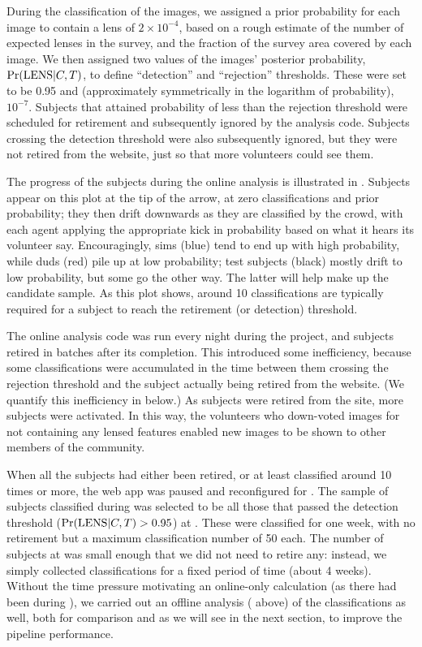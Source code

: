 \documentclass[useAMS,usenatbib,a4paper]{mn2e}
\begin{document}
During the \StageOne classification of the \cfhtls images, we assigned a prior
probability for each image to contain a lens of $2\times10^{-4}$, based on a
rough estimate of the number of expected lenses in the survey, and the fraction
of the survey area covered by each image. We then assigned two values of the
images' posterior probability, ${\rm Pr}({\rm LENS}|C,T)$, to define ``detection'' and
``rejection'' thresholds. These were set to be 0.95 and (approximately
symmetrically in the logarithm of probability), $10^{-7}$. Subjects that
attained probability of less than the rejection threshold were scheduled for
retirement and subsequently ignored by the analysis code. Subjects crossing the
detection threshold were also subsequently ignored, but they were not
retired from the website, just so that more volunteers could see them.

The progress of the subjects during the online analysis is illustrated in
. Subjects appear on this plot at the tip of
the arrow, at zero classifications and prior probability; they then drift
downwards as they are classified by the crowd, with each agent applying the
appropriate kick in probability based on what it hears its volunteer say.
Encouragingly, sims (blue) tend to end up with high probability, while duds
(red) pile up at low probability; test subjects (black) mostly drift to low
probability, but some go the other way. The latter will help make up the
candidate sample. As this plot shows, around 10 classifications are typically
required for a subject to reach the retirement (or detection) threshold.

The online analysis code was run every night during the project, and subjects retired
in batches after its completion. This introduced some inefficiency, because
some classifications were accumulated in the time between them crossing the
rejection threshold and the subject actually being retired from the website.
(We quantify this inefficiency in  below.)
As subjects were retired from the site, more subjects were activated. In this
way, the volunteers who down-voted images for not containing any lensed
features enabled new images to be shown to other members of the community.

When all the subjects had either been retired, or at least
classified around 10 times or
more, the web app was paused and reconfigured for \StageTwo. The sample of
subjects classified during \StageTwo was selected to be all those that passed
the detection threshold (${\rm Pr}({\rm LENS}|C,T) > 0.95$) at \StageOne. These were
classified for one week, with no retirement but a maximum classification number
of 50 each. The number of subjects at \StageTwo was small enough that we did not
need to retire any: instead, we simply collected classifications for a fixed
period of time (about 4 weeks). Without the time pressure motivating an
online-only calculation (as there had been during \StageOne), we carried out an
offline analysis ( above) of the  \StageTwo
classifications as well, both  for comparison and as we will see in the next
section, to improve the pipeline performance.
\end{document}
